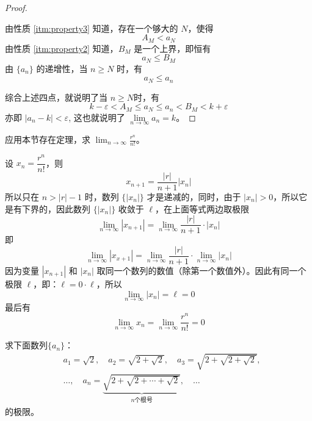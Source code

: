 \begin{proof}
\begin{figure}
    \caption{}\label{fig:k_between_A_B}
\end{figure}
由性质 \ref{itm:property3} 知道，存在一个够大的 $N$，使得
\begin{equation}
    A_M<a_N    
\end{equation}
由性质 \ref{itm:property2} 知道，$B_M$ 是一个上界，即恒有
\begin{equation}
    a_N\leqslant B_M
\end{equation} 
由 $\{a_n\}$ 的递增性，当 $n\geqslant N$ 时，有
\begin{equation}
    a_N\leqslant a_n
\end{equation}

综合上述四点，就说明了当 $n\geqslant N$时，有
\[k-\varepsilon<A_M\le a_N\le a_n<B_M<k+\varepsilon\]
亦即 $|a_n-k|<\varepsilon$, 这也就说明了 $\lim\limits_{n\to\infty}a_n=k$。
\end{proof}


\begin{example}
  应用本节存在定理，求 $\displaystyle \lim_{n\to\infty}\frac{r^n}{n!}$。
\end{example}

\begin{solution}
    设 $x_n=\dfrac{r^n}{n!}$，则
\[x_{n+1}=\frac{|r|}{n+1}|x_n|\]
所以只在 $n>|r|-1$ 时，数列 $\{|x_n|\}$ 才是递减的，同时，由于 $|x_n|>0$，所以它是有下界的，因此数列 $\{|x_n|\}$ 收敛于 $\ell$，在上面等式两边取极限
\[\lim_{n\to\infty}|x_{n+1}|=\lim_{n\to\infty}\frac{|r|}{n+1}\cdot |x_n|\]
即
\[\lim_{n\to\infty}|x_{x+1}|=\lim_{n\to\infty}\frac{|r|}{n+1}\cdot \lim_{n\to\infty}|x_n|\]
因为变量 $|x_{n+1}|$ 和 $|x_n|$ 取同一个数列的数值（除第一个数值外）。因此有同一个极限 $\ell$，即：$\ell=0\cdot \ell$，所以
\[\lim_{n\to\infty}|x_n|=\ell=0\]
最后有
\[\lim_{n\to\infty} x_n=\lim_{n\to\infty} \frac{r^n}{n!} =0\]
\end{solution}

\begin{example}
    求下面数列$\{a_n\}$：
\[\begin{split}
   &  a_1=\sqrt{2},\quad a_2=\sqrt{2+\sqrt{2}},\quad a_3=\sqrt{2+\sqrt{2+\sqrt{2}}},\\
    & \ldots,\quad a_n=\underbrace{\sqrt{2+\sqrt{2+\cdots+\sqrt{2}}}}_{\text{$n$个根号}},\quad\ldots
\end{split} \]
的极限。
\end{example}
   

